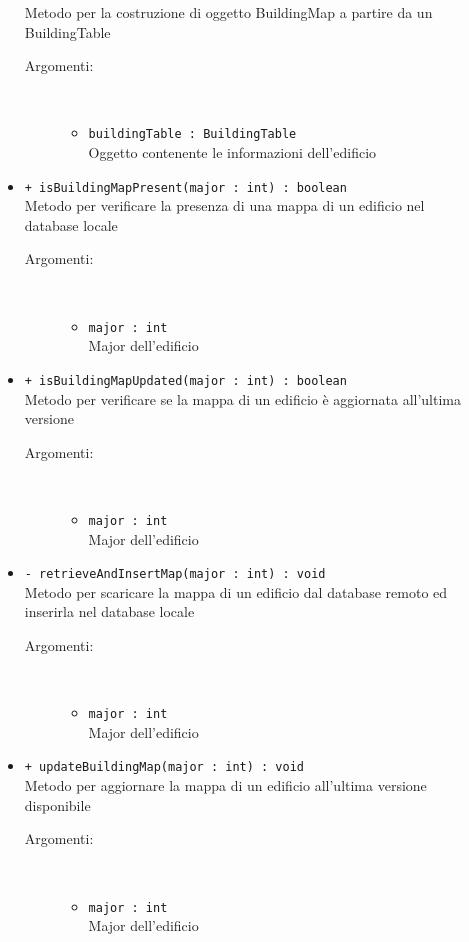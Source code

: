 \documentclass[../DefinizioneDiProdotto.tex]{subfiles}
\begin{document}
\begin{description}
\begin{itemize}
Metodo per la costruzione di oggetto BuildingMap a partire da un BuildingTable
 \begin{description}
\item[Argomenti:] \
\begin{itemize}
\item \texttt{buildingTable : BuildingTable}\\
Oggetto contenente le informazioni dell'edificio\end{itemize}
\end{description}
\item \texttt{+ isBuildingMapPresent(major : int) : boolean}\\
Metodo per verificare la presenza di una mappa di un edificio nel database locale
 \begin{description}
\item[Argomenti:] \
\begin{itemize}
\item \texttt{major : int}\\
Major dell'edificio\end{itemize}
\end{description}
\item \texttt{+ isBuildingMapUpdated(major : int) : boolean}\\
Metodo per verificare se la mappa di un edificio è aggiornata all'ultima versione
 \begin{description}
\item[Argomenti:] \
\begin{itemize}
\item \texttt{major : int}\\
Major dell'edificio\end{itemize}
\end{description}
\item \texttt{- retrieveAndInsertMap(major : int) : void}\\
Metodo per scaricare la mappa di un edificio dal database remoto ed inserirla nel database locale
 \begin{description}
\item[Argomenti:] \
\begin{itemize}
\item \texttt{major : int}\\
Major dell'edificio\end{itemize}
\end{description}
\item \texttt{+ updateBuildingMap(major : int) : void}\\
Metodo per aggiornare la mappa di un edificio all'ultima versione disponibile
 \begin{description}
\item[Argomenti:] \
\begin{itemize}
\item \texttt{major : int}\\
Major dell'edificio\end{itemize}
\end{description}
\end{itemize}
\end{description}
\end{document}
